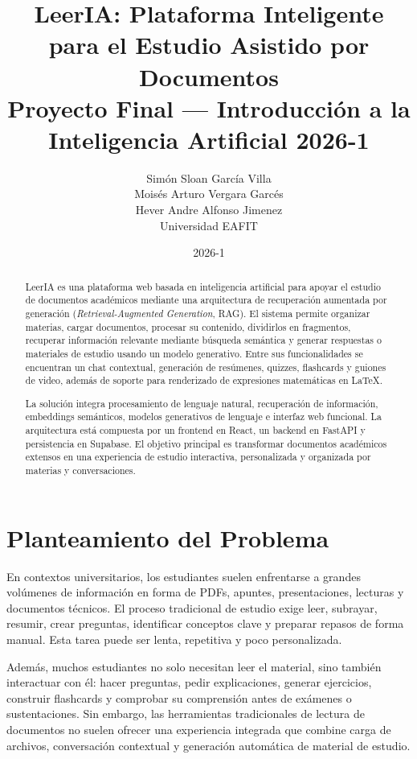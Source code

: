 \documentclass[12pt, letterpaper]{article}
\title{
	\textbf{LeerIA: Plataforma Inteligente para el Estudio Asistido por Documentos}\\
	\large Proyecto Final --- Introducción a la Inteligencia Artificial 2026-1
}
\author{
	Simón Sloan García Villa\\
	Moisés Arturo Vergara Garcés\\
	Hever Andre Alfonso Jimenez\\
	Universidad EAFIT
}
\date{2026-1}
\begin{document}
	
	\maketitle
	
	\begin{abstract}
		LeerIA es una plataforma web basada en inteligencia artificial para apoyar el estudio de documentos académicos mediante una arquitectura de recuperación aumentada por generación (\textit{Retrieval-Augmented Generation}, RAG). El sistema permite organizar materias, cargar documentos, procesar su contenido, dividirlos en fragmentos, recuperar información relevante mediante búsqueda semántica y generar respuestas o materiales de estudio usando un modelo generativo. Entre sus funcionalidades se encuentran un chat contextual, generación de resúmenes, quizzes, flashcards y guiones de video, además de soporte para renderizado de expresiones matemáticas en LaTeX.
		
		La solución integra procesamiento de lenguaje natural, recuperación de información, embeddings semánticos, modelos generativos de lenguaje e interfaz web funcional. La arquitectura está compuesta por un frontend en React, un backend en FastAPI y persistencia en Supabase. El objetivo principal es transformar documentos académicos extensos en una experiencia de estudio interactiva, personalizada y organizada por materias y conversaciones.
	\end{abstract}
	\newpage
	\tableofcontents
	\newpage
	

	\section{Planteamiento del Problema}

	
	En contextos universitarios, los estudiantes suelen enfrentarse a grandes volúmenes de información en forma de PDFs, apuntes, presentaciones, lecturas y documentos técnicos. El proceso tradicional de estudio exige leer, subrayar, resumir, crear preguntas, identificar conceptos clave y preparar repasos de forma manual. Esta tarea puede ser lenta, repetitiva y poco personalizada.
	
	Además, muchos estudiantes no solo necesitan leer el material, sino también interactuar con él: hacer preguntas, pedir explicaciones, generar ejercicios, construir flashcards y comprobar su comprensión antes de exámenes o sustentaciones. Sin embargo, las herramientas tradicionales de lectura de documentos no suelen ofrecer una experiencia integrada que combine carga de archivos, conversación contextual y generación automática de material de estudio.
	
\end{document}
